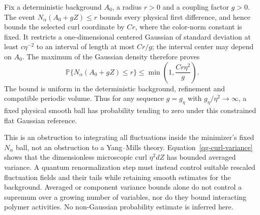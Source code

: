Fix a deterministic background $A_0$, a radius $r>0$ and
a coupling factor $g>0$. The event
$N_\alpha(A_0+gZ)\le r$ bounds every physical first difference,
and hence bounds the selected curl coordinate by $C r$,
where the color-norm constant is fixed. It restricts a
one-dimensional centered Gaussian of standard deviation
at least $c\eta^{-2}$ to an interval of length at most
$C r/g$; the interval center may depend on $A_0$.
The maximum of the Gaussian density therefore proves
\begin{equation}\label{qg-small-ball}
 \boxed{\quad
 \mathbb P\{N_\alpha(A_0+gZ)\le r\}
       \le \min\left(1,\frac{C r\eta^2}{g}\right).
 \quad}
\end{equation}
The bound is uniform in the deterministic background,
refinement and compatible periodic volume. Thus for any
sequence $g=g_\eta$ with $g_\eta/\eta^2\to\infty$, a fixed
physical smooth ball has probability tending to zero under
this constrained flat Gaussian reference.

This is an obstruction to integrating all fluctuations inside
the minimizer's fixed $N_\alpha$ ball, not an obstruction to
a Yang--Mills theory. Equation~\eqref{qg-curl-variance} shows
that the dimensionless microscopic curl $\eta^2dZ$ has
bounded averaged variance. A quantum renormalization step
must instead control suitable rescaled fluctuation fields
and their tails while retaining smooth estimates for the
background. Averaged or component variance bounds alone
do not control a supremum over a growing number of variables,
nor do they bound interacting polymer activities. No
non-Gaussian probability estimate is inferred here.
